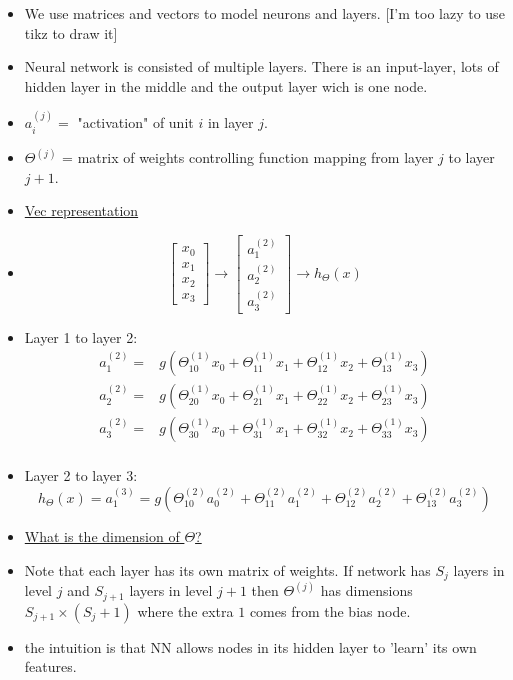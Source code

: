 \documentclass[12pt]{article}
\begin{document}
\begin{itemize}
	\item We use matrices and vectors to model neurons and layers. [I'm too lazy to use tikz to draw it]
	\item Neural network is consisted of multiple layers. There is an input-layer, lots of hidden layer in the middle and the output layer wich is one node. 
	\item $a_i^{(j)} = $ "activation" of unit $i$ in layer $j$.
	\item $\Theta^{(j)}$ = matrix of weights controlling function mapping from layer $j$ to layer $j+1$.
	\item \underline{Vec representation}
	 \item 
	 $$  \begin{bmatrix}
	 x_0 \\
	 x_1 \\
	 x_2 \\
	 x_3 \end{bmatrix}
	 \to
	 \left[
	 \begin{array}{ccc}
	 a_1^{(2)}\\
	 a_2^{(2)} \\
	 a_3^{(2)} 
	 \end{array}
	 \right]
	 \to h_\Theta(x)
	 $$
	 \item Layer 1 to layer 2:
	\begin{align*}
	a_1^{(2)} = & g(\Theta_{10}^{(1)}x_0 + \Theta_{11}^{(1)}x_1+\Theta_{12}^{(1)}x_2+\Theta_{13}^{(1)}x_3 )\\	a_2^{(2)} = & g(\Theta_{20}^{(1)}x_0 + \Theta_{21}^{(1)}x_1+\Theta_{22}^{(1)}x_2+\Theta_{23}^{(1)}x_3 )\\
	a_3^{(2)} = & g(\Theta_{30}^{(1)}x_0 + \Theta_{31}^{(1)}x_1+\Theta_{32}^{(1)}x_2+\Theta_{33}^{(1)}x_3 )\\
	\end{align*}
	\item Layer 2 to layer 3:
	\[
	h_\Theta(x)=a_1^{(3)} = g(\Theta_{10}^{(2)}a_0^{(2)}  + \Theta_{11}^{(2)}a_1^{(2)} + \Theta_{12}^{(2)}a_2^{(2)}+ \Theta_{13}^{(2)}a_3^{(2)}  )
	\]
	\item \underline{What is the dimension of $\Theta$?}
	\item Note that each layer has its own matrix of weights. If network has $S_j$ layers in level $j$ and $S_{j+1}$ layers in level $j+1$ then $\Theta^{(j)}$ has dimensions $S_{j+1}\times (S_j+1)$ where the extra $1$ comes from the bias node.
	\item the intuition is that NN allows nodes in its hidden layer to 'learn' its own features.
	
\end{itemize}
\end{document}
